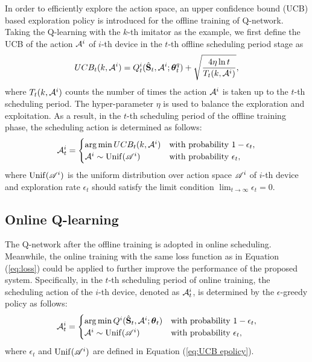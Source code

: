 In order to efficiently explore the action space, an upper confidence bound (UCB) based exploration policy is introduced for the offline training of Q-network. Taking the Q-learning with the $k$-th imitator as the example, we first define the UCB of the action $\mathcal{A}^{i}$ of ${i}$-th device in the $t$-th offline scheduling period stage as
\begin{equation}
   \label{eq:UCB}
   UCB_{t}(k, \mathcal{A}^{i}) =
   Q_{t}^{i}(\hat{\mathbf{S}}_t, \mathcal{A}^{i}; \boldsymbol{\theta}^q_{t})
   +
   \sqrt{\frac{4\eta\ln t}{T_{t}( k , \mathcal{A}^{i})}},
\end{equation}
where $T_t(k,\mathcal{A}^{i})$ counts the number of times the action $\mathcal{A}^{i}$ is taken up to the $t$-th scheduling period. The hyper-parameter $\eta$ is used to balance the exploration and exploitation.
As a result, in the $t$-th scheduling period of the offline training phase, the scheduling action is determined as follows:
\begin{equation}
   \label{eq:UCB epolicy}
   \mathcal{A}_t^{i} = \begin{cases}
      \operatorname*{arg\,min} UCB_{t}(k, \mathcal{A}^{i}) & \text{with probability } 1 - \epsilon_t, \\
      \mathcal{A}^{i} \sim \mathrm{Unif}(\mathscr{A}^{i}) & \text{with probability } \epsilon_t,
   \end{cases}
\end{equation}
where $\mathrm{Unif}(\mathscr{A}^{i})$ is the uniform distribution over action space $\mathscr{A}^{i}$ of ${i}$-th device and exploration rate $\epsilon_t$ should satisfy the limit condition $\lim_{t \to \infty} \epsilon_t = 0$.

\subsection{Online Q-learning} 
The Q-network after the offline training is adopted in online scheduling. Meanwhile, the online training with the same loss function as in Equation (\ref{eq:loss}) could be applied to further improve the performance of the proposed {\algName} system. Specifically, in the $t$-th scheduling period of online training, the scheduling action of the ${i}$-th device, denoted as $\mathcal{A}_t^i$, is determined by the $\epsilon$-greedy policy as follows:
\begin{equation}
   \label{eq:online epolicy}
   \mathcal{A}_t^{i} = \begin{cases}
      \operatorname*{arg\,min} Q^{i}(\hat{\mathbf{S}}_t, \mathcal{A}^{i}; \boldsymbol{\theta}_{t}) & \text{with probability } 1 - \epsilon_t, \\
      \mathcal{A}^{i} \sim \mathrm{Unif}(\mathscr{A}^{i})            & \text{with probability } \epsilon_t,
   \end{cases}
\end{equation}
where $\epsilon_t$ and $\mathrm{Unif}(\mathscr{A}^{i})$ are defined in Equation (\ref{eq:UCB epolicy}).

